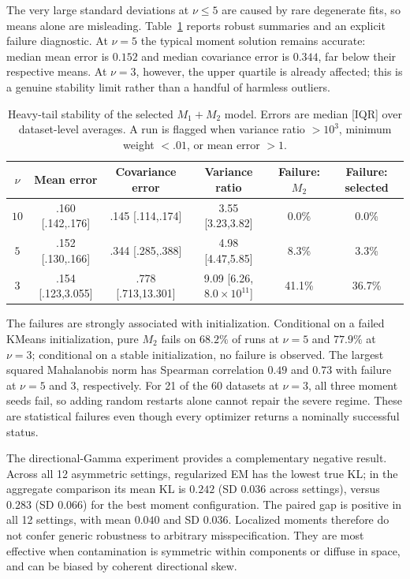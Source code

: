 \documentclass[11pt,a4paper]{article}
\newcommand{\Mone}{M_1}
\newcommand{\Mtwo}{M_2}
\begin{document}
The very large standard deviations at $\nu\leq5$ are caused by rare
degenerate fits, so means alone are misleading.  Table~\ref{tab:student_robust}
reports robust summaries and an explicit failure diagnostic.  At $\nu=5$ the
typical moment solution remains accurate: median mean error is $0.152$ and
median covariance error is $0.344$, far below their respective means.  At
$\nu=3$, however, the upper quartile is already affected; this is a genuine
stability limit rather than a handful of harmless outliers.

\begin{table}[ht]
\centering
\scriptsize
\caption{Heavy-tail stability of the selected $\Mone+\Mtwo$ model.  Errors
are median [IQR] over dataset-level averages.  A run is flagged when variance
ratio $>10^3$, minimum weight $<.01$, or mean error $>1$.}
\label{tab:student_robust}
\begin{tabular}{@{}c c c c c c@{}}
\toprule
$\nu$ & Mean error & Covariance error & Variance ratio
 & Failure: $\Mtwo$ & Failure: selected \\
\midrule
$10$ & .160 [.142,.176] & .145 [.114,.174] & 3.55 [3.23,3.82] & 0.0\% & 0.0\% \\
$5$  & .152 [.130,.166] & .344 [.285,.388] & 4.98 [4.47,5.85] & 8.3\% & 3.3\% \\
$3$  & .154 [.123,3.055] & .778 [.713,13.301] & 9.09 [6.26,$8.0\!\times\!10^{11}$]
 & 41.1\% & 36.7\% \\
\bottomrule
\end{tabular}
\end{table}
\FloatBarrier

The failures are strongly associated with initialization.  Conditional on a
failed KMeans initialization, pure $\Mtwo$ fails on $68.2\%$ of runs at
$\nu=5$ and $77.9\%$ at $\nu=3$; conditional on a stable initialization, no
failure is observed.  The largest squared Mahalanobis norm has Spearman
correlation $0.49$ and $0.73$ with failure at $\nu=5$ and $3$, respectively.
For 21 of the 60 datasets at $\nu=3$, all three moment seeds fail, so adding
random restarts alone cannot repair the severe regime.  These are statistical
failures even though every optimizer returns a nominally successful status.

The directional-Gamma experiment provides a complementary negative result.
Across all 12 asymmetric settings, regularized EM has the lowest true KL; in
the aggregate comparison its mean KL is $0.242$ (SD $0.036$ across settings),
versus $0.283$ (SD $0.066$) for the best moment configuration.  The paired
gap is positive in all 12 settings, with mean $0.040$ and SD $0.036$.
Localized moments therefore do not confer generic robustness to arbitrary
misspecification.  They are most effective when contamination is symmetric
within components or diffuse in space, and can be biased by coherent
directional skew.
\end{document}
